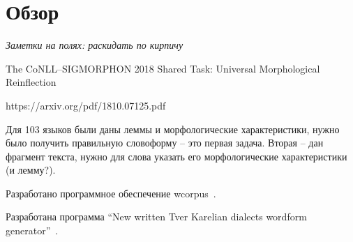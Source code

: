 \chapter{Обзор} \label{chapt_review}



\emph{Заметки на полях: раскидать по кирпичу}

The CoNLL--SIGMORPHON 2018   Shared Task: Universal Morphological Reinflection

https://arxiv.org/pdf/1810.07125.pdf

Для 103 языков были даны леммы и морфологические характеристики, 
нужно было получить правильную словоформу -- это первая задача. 
Вторая -- дан фрагмент текста, нужно для слова указать его морфологические 
характеристики (и лемму?).

Разработано программное обеспечение wcorpus~\cite{vakbib_soft_wcorpus}.

Разработана программа ``New written Tver Karelian dialects wordform generator''~\cite{vakbib_soft_Tver_generator}.






